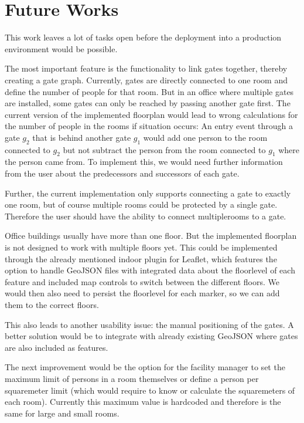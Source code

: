\section{Future Works}

This work leaves a lot of tasks open before the deployment into a production environment would be possible.

The most important feature is the functionality to link gates together, thereby creating a gate graph. Currently, gates are directly connected to one room and define the number of people for that room. But in an office where multiple gates are installed, some gates can only be reached by passing another gate first. The current version of the implemented floorplan would lead to wrong calculations for the number of people in the rooms if situation occurs: An entry event through a gate \(g_2\) that is behind another gate \(g_1\) would add one person to the room connected to \(g_2\) but not subtract the person from the room connected to \(g_1\) where the person came from. To implement this, we would need further information from the user about the predecessors and successors of each gate.

Further, the current implementation only supports connecting a gate to exactly one room, but of course multiple rooms could be protected by a single gate. Therefore the user should have the ability to connect multiplerooms to a gate.

Office buildings usually have more than one floor. But the implemented floorplan is not designed to work with multiple floors yet. This could be implemented through the already mentioned indoor plugin for Leaflet, which features the option to handle GeoJSON files with integrated data about the floorlevel of each feature and included map controls to switch between the different floors. We would then also need to persist the floorlevel for each marker, so we can add them to the correct floors.

This also leads to another usability issue: the manual positioning of the gates. A better solution would be to integrate with already existing GeoJSON where gates are also included as features.

The next improvement would be the option for the facility manager to set the maximum limit of persons in a room themselves or define a person per squaremeter limit (which would require to know or calculate the  squaremeters of each room). Currently this maximum value is hardcoded and therefore is the same for large and small rooms.

